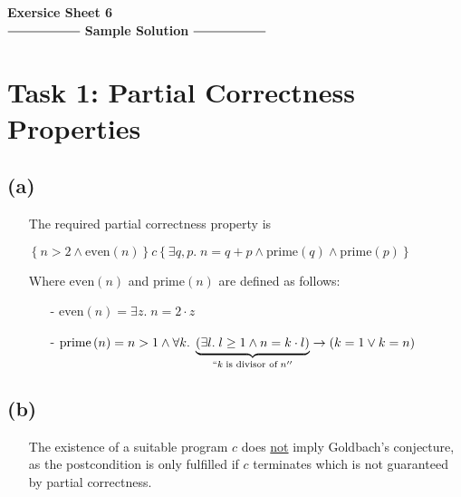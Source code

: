 \documentclass[12pt]{scrartcl}
\begin{document}
\begin{center}
	\huge\textbf{Exersice Sheet 6}\\[0.5cm]
	
	\Large
	$\mathrel{\vcenter{\hbox{\rule{2cm}{0.5pt}}}}$ \textbf{Sample 				Solution} $\mathrel{\vcenter{\hbox{\rule{2cm}{0.5pt}}}}$\\[1cm]
\end{center}
	\large

	\section*{Task 1: Partial Correctness Properties}
	
	\subsection*{(a)}
	
	\begin{enumerate}
	\item[] The required partial correctness property is
	\begin{center}
		$\left\{n>2\wedge\text{even}\left(n\right)\right\}c\left\{\exists q,p.\;n=q+p\wedge \text{prime}\left(q\right)\wedge\text{prime}\left(p\right)\right\}$\\
	\end{center}
	Where $\text{even}\left(n\right)$ and $\text{prime}\left(n\right)$ are defined as follows:
	\begin{enumerate}
		\item[-] $\text{even}\left(n\right)=\exists z.\;n=2\cdot z$
		\item[-] $\text{prime}\left(n\right)=n>1\wedge\forall k.\;\underbrace{\left(\exists l.\;l\geq 1\wedge n=k\cdot l\right)}_{``k\; \text{is divisor of}\; n''}\rightarrow\left(k=1\vee k=n\right)$	
	\end{enumerate}
	\end{enumerate}
	
	\subsection*{(b)}
	
	\begin{enumerate}
	\item[] The existence of a suitable program $c$ does \underline{not} imply Goldbach's conjecture, as the postcondition is only fulfilled if $c$ terminates which is not guaranteed by partial correctness.
	\end{enumerate}
	
\end{document}
